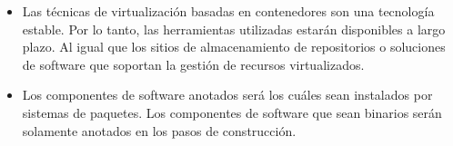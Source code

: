 \begin{itemize}
	\item Las técnicas de virtualización basadas en contenedores son una tecnología estable. Por lo tanto, las herramientas utilizadas estarán disponibles a largo plazo. Al igual que los sitios de almacenamiento de repositorios o soluciones de software que soportan la gestión de recursos virtualizados.
	\item Los componentes de software anotados será los cuáles sean instalados por sistemas de paquetes. Los componentes de software que sean binarios serán solamente anotados en los pasos de construcción. 
\end{itemize}